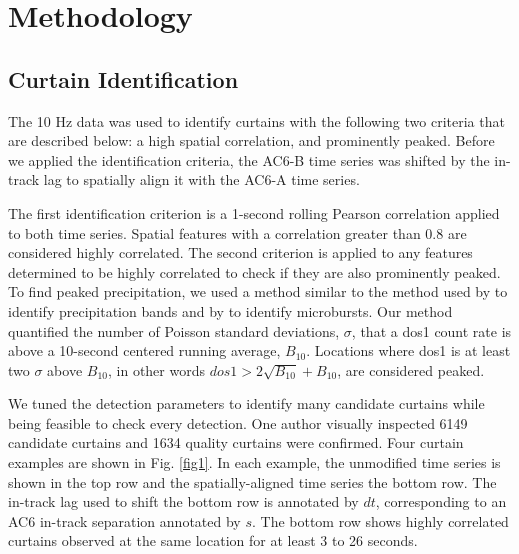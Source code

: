 \documentclass[draft]{agujournal2019}
\begin{document}
\section{Methodology} 
\subsection{Curtain Identification} \label{curtain_identification}
The 10 Hz data was used to identify curtains with the following two criteria that are described below: a high spatial correlation, and prominently peaked. Before we applied the identification criteria, the AC6-B time series was shifted by the in-track lag to spatially align it with the AC6-A time series. 

The first identification criterion is a 1-second rolling Pearson correlation applied to both time series. Spatial features with a correlation greater than 0.8 are considered highly correlated. The second criterion is applied to any features determined to be highly correlated to check if they are also prominently peaked. To find peaked precipitation, we used a method similar to the method used by  to identify precipitation bands and by  to identify microbursts. Our method quantified the number of Poisson standard deviations, $\sigma$, that a dos1 count rate is above a 10-second centered running average, $B_{10}$. Locations where dos1 is at least two $\sigma$ above $B_{10}$, in other words $dos1 > 2\sqrt{B_{10}} + B_{10}$, are considered peaked. 

We tuned the detection parameters to identify many candidate curtains while being feasible to check every detection. One author visually inspected 6149 candidate curtains and 1634 quality curtains were confirmed. Four curtain examples are shown in Fig. \ref{fig1}. In each example, the unmodified time series is shown in the top row and the spatially-aligned time series the bottom row. The in-track lag used to shift the bottom row is annotated by $dt$, corresponding to an AC6 in-track separation annotated by $s$. The bottom row shows highly correlated curtains observed at the same location for at least 3 to 26 seconds.
\end{document}
